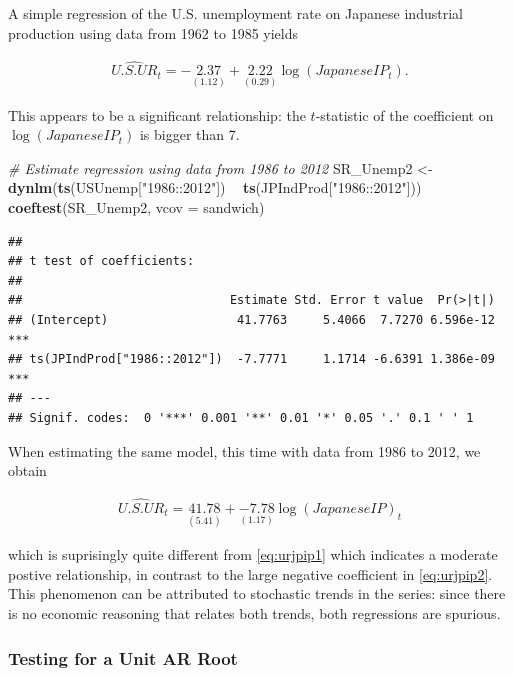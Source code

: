 \documentclass[]{book}
\newenvironment{Shaded}{\begin{snugshade}}{\end{snugshade}}
\newcommand{\KeywordTok}[1]{\textcolor[rgb]{0.13,0.29,0.53}{\textbf{#1}}}
\newcommand{\DataTypeTok}[1]{\textcolor[rgb]{0.13,0.29,0.53}{#1}}
\newcommand{\StringTok}[1]{\textcolor[rgb]{0.31,0.60,0.02}{#1}}
\newcommand{\CommentTok}[1]{\textcolor[rgb]{0.56,0.35,0.01}{\textit{#1}}}
\newcommand{\OperatorTok}[1]{\textcolor[rgb]{0.81,0.36,0.00}{\textbf{#1}}}
\newcommand{\NormalTok}[1]{#1}
\theoremstyle{definition}
\theoremstyle{definition}
\theoremstyle{definition}
\theoremstyle{remark}
\begin{document}
A simple regression of the U.S. unemployment rate on Japanese industrial
production using data from 1962 to 1985 yields

\begin{align}
  \widehat{U.S. UR}_t = -\underset{(1.12)}{2.37} + \underset{(0.29)}{2.22} \log(JapaneseIP_t). \label{eq:urjpip1}
\end{align}

This appears to be a significant relationship: the \(t\)-statistic of
the coefficient on \(\log(JapaneseIP_t)\) is bigger than 7.

\begin{Shaded}
\begin{Highlighting}[]
\CommentTok{# Estimate regression using data from 1986 to 2012}
\NormalTok{SR_Unemp2 <-}\StringTok{ }\KeywordTok{dynlm}\NormalTok{(}\KeywordTok{ts}\NormalTok{(USUnemp[}\StringTok{"1986::2012"}\NormalTok{]) }\OperatorTok{~}\StringTok{ }\KeywordTok{ts}\NormalTok{(JPIndProd[}\StringTok{"1986::2012"}\NormalTok{]))}
\KeywordTok{coeftest}\NormalTok{(SR_Unemp2, }\DataTypeTok{vcov =}\NormalTok{ sandwich)}
\end{Highlighting}
\end{Shaded}

\begin{verbatim}
## 
## t test of coefficients:
## 
##                             Estimate Std. Error t value  Pr(>|t|)    
## (Intercept)                  41.7763     5.4066  7.7270 6.596e-12 ***
## ts(JPIndProd["1986::2012"])  -7.7771     1.1714 -6.6391 1.386e-09 ***
## ---
## Signif. codes:  0 '***' 0.001 '**' 0.01 '*' 0.05 '.' 0.1 ' ' 1
\end{verbatim}

When estimating the same model, this time with data from 1986 to 2012,
we obtain

\begin{align}
  \widehat{U.S. UR}_t = \underset{(5.41)}{41.78} + \underset{(1.17)}{-7.78} \log(JapaneseIP)_t \label{eq:urjpip2}
\end{align}

which is suprisingly quite different from \eqref{eq:urjpip1} which
indicates a moderate postive relationship, in contrast to the large
negative coefficient in \eqref{eq:urjpip2}. This phenomenon can be
attributed to stochastic trends in the series: since there is no
economic reasoning that relates both trends, both regressions are
spurious.

\subsubsection*{Testing for a Unit AR
Root}\label{testing-for-a-unit-ar-root}
\end{document}
